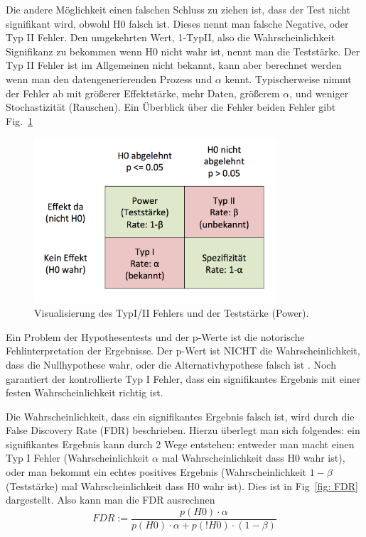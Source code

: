 \documentclass[a4paper,twoside]{tufte-book}\usepackage[]{graphicx}\usepackage[]{color}
\begin{document}
Die andere Möglichkeit einen falschen Schluss zu ziehen ist, dass der Test nicht signifikant wird, obwohl H0 falsch ist. Dieses nennt man falsche Negative, oder Typ II Fehler. Den umgekehrten Wert, 1-TypII, also die Wahrscheinlichkeit Signifikanz zu bekommen wenn H0 nicht wahr ist, nennt man die Teststärke. Der Typ II Fehler ist im Allgemeinen nicht bekannt, kann aber berechnet werden wenn man den datengenerierenden Prozess und $\alpha$ kennt. Typischerweise nimmt der Fehler ab mit größerer Effektstärke, mehr Daten, größerem $\alpha$, und weniger Stochastizität (Rauschen). Ein Überblick über die Fehler beiden Fehler gibt Fig.~\ref{fig: Error Types}

\begin{figure}[htb]
\begin{center}
\includegraphics[width = 9cm]{ErrorTypes}
\caption{Visualisierung des TypI/II Fehlers und der Teststärke (Power).}
\label{fig: Error Types}
\end{center}
\end{figure}

Ein Problem der Hypothesentests und der p-Werte ist die notorische Fehlinterpretation der Ergebnisse. Der p-Wert ist NICHT die Wahrscheinlichkeit, dass die Nullhypothese wahr, oder die Alternativhypothese falsch ist \citep[siehe][]{Cohen-earthisround-1994}. Noch garantiert der kontrollierte Typ I Fehler, dass ein signifikantes Ergebnis mit einer festen Wahrscheinlichkeit richtig ist. 

Die Wahrscheinlichkeit, dass ein signifikantes Ergebnis falsch ist, wird durch die False Discovery Rate (FDR) beschrieben. Hierzu überlegt man sich folgendes: ein signifikantes Ergebnis kann durch 2 Wege entstehen: entweder man macht einen Typ I Fehler (Wahrscheinlichkeit $\alpha$ mal Wahrscheinlichkeit dass H0 wahr ist), oder man bekommt ein echtes positives Ergebnis (Wahrscheinlichkeit $1-\beta$ (Teststärke) mal Wahrscheinlichkeit dass H0 wahr ist). Dies ist in Fig~\ref{fig: FDR} dargestellt. Also kann man die FDR ausrechnen
\begin{equation}
FDR := \frac{p(H0) \cdot \alpha}{ p(H0) \cdot \alpha + p(!H0) \cdot (1-\beta)}
\end{equation}
\end{document}
